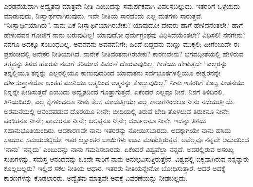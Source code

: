 ಎರಡನೆಯದಾಗಿ ಅದ್ವೈತವು ಮಾತ್ರವೇ ನೀತಿ ಎಂಬುದನ್ನು ಸಮರ್ಪಕವಾಗಿ ವಿವರಿಸಬಲ್ಲುದು. ಇತರರಿಗೆ ಒಳ್ಳೆಯದು ಮಾಡುವುದು, ನಿಃಸ್ವಾರ್ಥರಾಗಿರುವುದು, ಇವೇ ನೀತಿಯ ಸಾರವೆಂದು ಎಲ್ಲ ಮತಗಳು ಸಾರುತ್ತವೆ. “ನಿಃಸ್ವಾರ್ಥಿಯಾಗಿರು”. ನಾನು ಏಕೆ ನಿಃಸ್ವಾರ್ಥಿಯಾಗಿರಬೇಕು? ಯಾವುದೋ ದೇವರು ಹಾಗೆ ಹೇಳಿದನೆಂತಲೇ? ಹಾಗೆ ಹೇಳುವವನ ಗೋಜಿಗೆ ನಾನು ಬರುವುದಿಲ್ಲ! ಯಾವುದೋ ಧರ್ಮಗ್ರಂಥವು ವಿಧಿಸಿದೆಯೆಂತಲೇ? ವಿಧಿಸಲಿ! ನನಗೇನು? ನನಗೂ ಅದಕ್ಕೂ ಸಂಬಂಧವಿಲ್ಲ. ಅವನವನು ಅವನವನಿಗೇ; ಹಿಂದೆ ಬಿದ್ದವನು ಮಣ್ಣು ಮುಕ್ಕಲಿ; ಹೀಗೆಂಬುದೇ ಈ ಪ್ರಪಂಚದಲ್ಲಿ ಅನೇಕರ ನೀತಿಯಾಗಿದೆ. ನಾನೇಕೆ ನೀತಿವಂತನಾಗಿರಬೇಕು? ಕಾರಣವೇನು? ಭಗವದ್ಗೀತೆಯಲ್ಲಿ ಹೇಳಿರುವ ತತ್ತ್ವವನ್ನು ತಿಳಿದ ಹೊರತು ನಮಗೆ ಸರಿಯಾದ ವಿವರಣೆ ದೊರಕುವುದಿಲ್ಲ. ಗೀತೆಯು ಹೇಳುತ್ತದೆ: “ಎಲ್ಲರನ್ನು ತನ್ನಲ್ಲಿಯೂ ತನ್ನನ್ನು ಎಲ್ಲರಲ್ಲಿಯೂ ಕಾಣುವುದರಿಂದ ಯಾವಾತನು ಸರ್ವಭೂತಗಳಲ್ಲಿಯೂ ಈಶ್ವರನನ್ನೇ ದರ್ಶಿಸುತ್ತಾನೆಯೋ ಅಂತಹ ಮುನಿಯು ಆತ್ಮದಿಂದ ಆತ್ಮನನ್ನು ಕೊಲ್ಲುವುದಿಲ್ಲ.” ನೀನು ಇತರರಿಗೆ ಕೊಟ್ಟ ಪೀಡನೆಯು ನಿನ್ನನ್ನೇ ಪೀಡಿಸುತ್ತದೆ ಎಂಬುದು ಅದ್ವೈತದಿಂದ ಗೊತ್ತಾಗುತ್ತದೆ. ಏಕೆಂದರೆ ಎಲ್ಲವೂ ನೀನೆ. ನಿನಗೆ ತಿಳಿದಿರಲಿ, ತಿಳಿಯದಿರಲಿ, ಎಲ್ಲ ಕೈಗಳಿಂದಲೂ ನೀನು ಕೆಲಸ ಮಾಡುತ್ತೀಯೆ; ಎಲ್ಲ ಕಾಲುಗಳಿಂದಲೂ ನೀನು ನಡೆಯುತ್ತೀಯೆ. ಅರಮನೆಯಲ್ಲಿ ಆನಂದಪಡುವ ದೊರೆಯೂ ನೀನೇ; ಬೀದಿಯಲ್ಲಿ ತಿರುಪೆ ಬೇಡಿ ತೊಳಲುವ ತಿರುಕನೂ ನೀನೇ; ಪಂಡಿತನೂ ನೀನೇ; ಪಾಮರನೂ ನೀನೇ; ಬಲಿಷ್ಠನೂ ನೀನೇ; ದುರ್ಬಲನೂ ನೀನೇ. ಇದನ್ನು ತಿಳಿದು ಸಹಾನುಭೂತಿಯಿಂದಿರು. ಆದಕಾರಣವೇ ನಾನು ಇತರರನ್ನು ನೋಯಿಸಬಾರದು. ಅದಕ್ಕಾಗಿಯೇ ನಾನು ಹಸಿದು ಸಾಯುವ ಸಮಯದಲ್ಲಿಯೇ ಇತರ ಲಕ್ಷಾಂತರ ಬಾಯಿಗಳು ಊಟ ಮಾಡುತ್ತಿರುತ್ತವೆ. ಅವೆಲ್ಲವೂ ನನ್ನವೇ ಆದುದರಿಂದ ‘ನಾನು’ ‘ನನ್ನದು’ ಎಂಬುದನ್ನು ನಾನು ಗಮನಿಸಬಾರದು. ಏಕೆಂದರೆ ವಿಶ್ವವೆಲ್ಲಾ ನನ್ನದೆ. ಅದರಲ್ಲಿರುವ ಅಸಂಖ್ಯ ಸುಖಗಳನ್ನು, ಸಮಸ್ತ ಆನಂದವನ್ನು ಒಂದೇ ಸಾರಿಗೆ ನಾನು ಅನುಭವಿಸುತ್ತಿರುತ್ತೇನೆ. ವಿಶ್ವದಲ್ಲಿ ಐಕ್ಯವಾಗಿರುವ ನನ್ನನ್ನಾರು ಕೊಲ್ಲಬಲ್ಲರು? ಇಲ್ಲಿದೆ ಸಕಲ ನೀತಿಯ ಆಧಾರ. ಇತರರು ನೀತಿಯನ್ನೇನೋ ಬೋಧಿಸುತ್ತಾರೆ. ಆದರೆ ಅದಕ್ಕೆ ಕಾರಣಗಳನ್ನು ಕೊಡಲಾರರು. ಅದ್ವೈತವು ಮಾತ್ರವೇ ಅದಕ್ಕೆ ವಿವರಣೆಯನ್ನು ನೀಡಬಲ್ಲದು.

